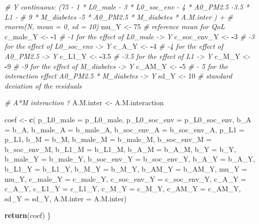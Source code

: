 \documentclass[
]{book}
\newenvironment{Shaded}{\begin{snugshade}}{\end{snugshade}}
\newcommand{\AttributeTok}[1]{\textcolor[rgb]{0.13,0.29,0.53}{#1}}
\newcommand{\CommentTok}[1]{\textcolor[rgb]{0.56,0.35,0.01}{\textit{#1}}}
\newcommand{\DecValTok}[1]{\textcolor[rgb]{0.00,0.00,0.81}{#1}}
\newcommand{\FloatTok}[1]{\textcolor[rgb]{0.00,0.00,0.81}{#1}}
\newcommand{\FunctionTok}[1]{\textcolor[rgb]{0.13,0.29,0.53}{\textbf{#1}}}
\newcommand{\NormalTok}[1]{#1}
\newcommand{\OtherTok}[1]{\textcolor[rgb]{0.56,0.35,0.01}{#1}}
\newcommand{\SpecialCharTok}[1]{\textcolor[rgb]{0.81,0.36,0.00}{\textbf{#1}}}
\begin{document}
\begin{Shaded}
\begin{Highlighting}[]
\CommentTok{\# Y continuous: (75 {-} 1 * L0\_male {-} 3 * L0\_soc\_env {-} 4 * A0\_PM2.5 {-}3.5 * L1 {-} }
\CommentTok{\#                9 * M\_diabetes {-}5 * A0\_PM2.5 * M\_diabetes * A.M.inter ) + }
\CommentTok{\#                rnorm(N, mean = 0, sd = 10)}
\NormalTok{mu\_Y }\OtherTok{\textless{}{-}} \DecValTok{75} \CommentTok{\# reference mean for QoL}
\NormalTok{c\_male\_Y }\OtherTok{\textless{}{-}} \SpecialCharTok{{-}}\DecValTok{1} \CommentTok{\# {-}1 for the effect of L0\_male {-}\textgreater{} Y}
\NormalTok{c\_soc\_env\_Y }\OtherTok{\textless{}{-}} \SpecialCharTok{{-}}\DecValTok{3} \CommentTok{\# {-}3 for the effect of L0\_soc\_env {-}\textgreater{} Y}
\NormalTok{c\_A\_Y }\OtherTok{\textless{}{-}} \SpecialCharTok{{-}}\DecValTok{4} \CommentTok{\# {-}4 for the effect of A0\_PM2.5 {-}\textgreater{} Y}
\NormalTok{c\_L1\_Y }\OtherTok{\textless{}{-}} \SpecialCharTok{{-}}\FloatTok{3.5} \CommentTok{\# {-}3.5 for the effect of L1 {-}\textgreater{} Y}
\NormalTok{c\_M\_Y }\OtherTok{\textless{}{-}} \SpecialCharTok{{-}}\DecValTok{9} \CommentTok{\# {-}9 for the effect of M\_diabetes {-}\textgreater{} Y}
\NormalTok{c\_AM\_Y }\OtherTok{\textless{}{-}} \SpecialCharTok{{-}}\DecValTok{5}  \CommentTok{\# {-} 5 for the interaction effect A0\_PM2.5 * M\_diabetes  {-}\textgreater{} Y}
\NormalTok{sd\_Y }\OtherTok{\textless{}{-}} \DecValTok{10} \CommentTok{\# standard deviation of the residuals}

\CommentTok{\# A*M interaction ?}
\NormalTok{A.M.inter }\OtherTok{\textless{}{-}}\NormalTok{ A.M.interaction}

\NormalTok{coef }\OtherTok{\textless{}{-}} \FunctionTok{c}\NormalTok{( }\AttributeTok{p\_L0\_male =}\NormalTok{ p\_L0\_male, }\AttributeTok{p\_L0\_soc\_env =}\NormalTok{ p\_L0\_soc\_env, }
           \AttributeTok{b\_A =}\NormalTok{ b\_A, }\AttributeTok{b\_male\_A =}\NormalTok{ b\_male\_A, }\AttributeTok{b\_soc\_env\_A =}\NormalTok{ b\_soc\_env\_A, }
           \AttributeTok{p\_L1 =}\NormalTok{ p\_L1,}
           \AttributeTok{b\_M =}\NormalTok{ b\_M, }\AttributeTok{b\_male\_M =}\NormalTok{ b\_male\_M, }\AttributeTok{b\_soc\_env\_M =}\NormalTok{ b\_soc\_env\_M, }
            \AttributeTok{b\_L1\_M =}\NormalTok{ b\_L1\_M, }\AttributeTok{b\_A\_M =}\NormalTok{ b\_A\_M,}
           \AttributeTok{b\_Y =}\NormalTok{ b\_Y, }\AttributeTok{b\_male\_Y =}\NormalTok{ b\_male\_Y, }\AttributeTok{b\_soc\_env\_Y =}\NormalTok{ b\_soc\_env\_Y, }
            \AttributeTok{b\_A\_Y =}\NormalTok{ b\_A\_Y, }\AttributeTok{b\_L1\_Y =}\NormalTok{ b\_L1\_Y, }\AttributeTok{b\_M\_Y =}\NormalTok{ b\_M\_Y, }\AttributeTok{b\_AM\_Y =}\NormalTok{ b\_AM\_Y,}
           \AttributeTok{mu\_Y =}\NormalTok{ mu\_Y, }\AttributeTok{c\_male\_Y =}\NormalTok{ c\_male\_Y, }\AttributeTok{c\_soc\_env\_Y =}\NormalTok{ c\_soc\_env\_Y, }
            \AttributeTok{c\_A\_Y =}\NormalTok{ c\_A\_Y, }\AttributeTok{c\_L1\_Y =}\NormalTok{ c\_L1\_Y, }\AttributeTok{c\_M\_Y =}\NormalTok{ c\_M\_Y, }\AttributeTok{c\_AM\_Y =}\NormalTok{ c\_AM\_Y, }
           \AttributeTok{sd\_Y =}\NormalTok{ sd\_Y, }\AttributeTok{A.M.inter =}\NormalTok{ A.M.inter)}
  
\FunctionTok{return}\NormalTok{(coef)}
\NormalTok{\}}
\end{Highlighting}
\end{Shaded}
\end{document}
